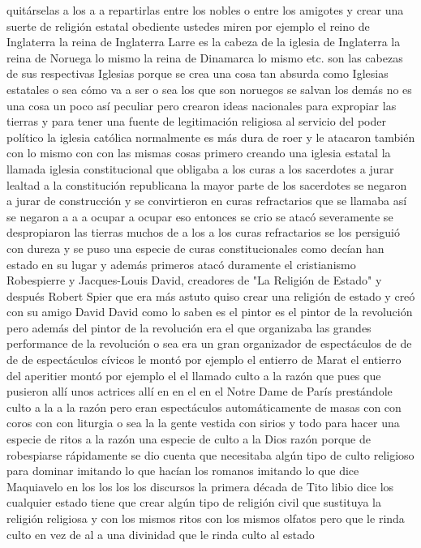 quitárselas a los a a repartirlas entre los nobles o entre los amigotes y crear una suerte de religión estatal obediente
ustedes miren por ejemplo el reino de Inglaterra la reina de Inglaterra Larre es la cabeza de la iglesia de Inglaterra
la reina de Noruega lo mismo la reina de Dinamarca lo mismo etc. son las cabezas de sus respectivas Iglesias porque se crea una cosa tan absurda como Iglesias
estatales o sea cómo va a ser o sea los que son noruegos se salvan los demás no
es una cosa un poco así peculiar pero crearon ideas nacionales para expropiar las tierras
y para tener una fuente de legitimación religiosa al servicio del poder político la iglesia católica normalmente es más dura de roer
y le atacaron también con lo mismo con con las mismas cosas primero creando una iglesia estatal
la llamada iglesia constitucional que obligaba a los curas a los sacerdotes a jurar
lealtad a la constitución republicana la mayor parte de los sacerdotes se negaron a jurar de construcción y se convirtieron en curas refractarios
que se llamaba así se negaron a a a ocupar a ocupar eso entonces se crio
se atacó severamente se despropiaron las tierras muchos de a los a los curas refractarios se los persiguió con dureza
y se puso una especie de curas constitucionales como decían han estado en su lugar y además primeros atacó duramente el cristianismo
Robespierre y Jacques-Louis David, creadores de "La Religión de Estado"
y después Robert Spier que era más astuto quiso crear una religión de estado y creó con su amigo David
David como lo saben es el pintor es el pintor de la revolución pero además del pintor de la revolución era el que organizaba las grandes performance
de la revolución o sea era un gran organizador de espectáculos de de de de espectáculos cívicos
le montó por ejemplo el entierro de Marat el entierro del aperitier montó por ejemplo
el el llamado culto a la razón que pues que pusieron allí unos actrices allí en en el en el Notre Dame de París
prestándole culto a la a la razón pero eran espectáculos automáticamente de masas con
con coros con con liturgia o sea la la gente vestida con sirios y todo
para hacer una especie de ritos a la razón una especie de culto a la Dios razón porque de robespiarse
rápidamente se dio cuenta que necesitaba algún tipo de culto religioso para dominar imitando lo que hacían los romanos
imitando lo que dice Maquiavelo en los los los los discursos la primera década de Tito libio
dice los cualquier estado tiene que crear algún tipo de religión civil que sustituya la religión religiosa y con los mismos ritos
con los mismos olfatos pero que le rinda culto en vez de al a una divinidad que le rinda culto al estado
